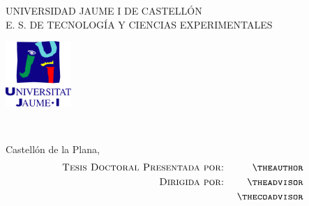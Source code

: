 
\thispagestyle{empty}
\pagestyle{empty}
\begin{center}
{\selectfont \sffamily \bf

{\Large UNIVERSIDAD JAUME I DE CASTELL\'{O}N}\\

\vspace*{1ex}
{\normalsize E. S. DE TECNOLOG\'{I}A Y CIENCIAS EXPERIMENTALES}\\

\vspace*{15ex}

\centerline{\includegraphics[width=2.5cm]{logo}}

\vspace{\fill}

{\Huge \sc \thetitle \\}

\vspace{\fill}

{\normalsize \sc Castell\'{o}n de la Plana, \thedate}\\

\vspace*{20ex}
\begin{eqnarray*}
    \mbox{ {\sc Tesis Doctoral Presentada por:}}  &&
        \mbox{ {\sc \theauthor}} \\
    \mbox{ {\sc Dirigida por:}} &&
        \mbox{ {\sc \theadvisor}} \\
    &&
        \mbox{ {\sc \thecoadvisor}}
\end{eqnarray*}
}
\end{center}
\newpage{\pagestyle{empty}\cleardoublepage}

